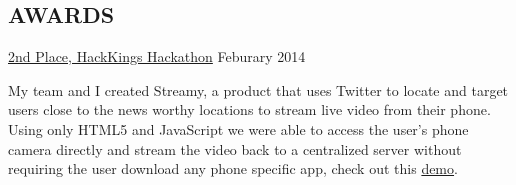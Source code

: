 \documentclass[line,margin]{cv}
\begin{document}
\begin{resume}
\section{AWARDS}

\href{https://hackkings2014s.devpost.com/submissions}{2nd Place, HackKings Hackathon}
\hfill Feburary 2014

\begin{adjustwidth}{2.0em}{2.0em}
    My team and I created Streamy, a product that uses Twitter to locate
    and target users close to the news worthy locations to stream live video
    from their phone. Using only HTML5 and JavaScript we were able to access
    the user's phone camera directly and stream the video back to a
    centralized server without requiring the user download any phone specific
    app, check out this \href{http://www.youtube.com/watch?v=JjMc1OaKEU0}{demo}.
\end{adjustwidth}


\end{resume}
\end{document}
